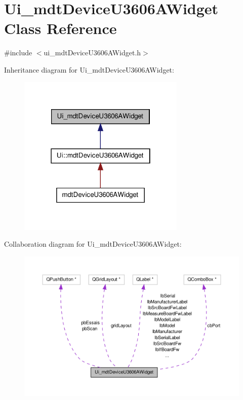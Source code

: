 \hypertarget{class_ui__mdt_device_u3606_a_widget}{\section{Ui\-\_\-mdt\-Device\-U3606\-A\-Widget Class Reference}
\label{class_ui__mdt_device_u3606_a_widget}
}


{\ttfamily \#include $<$ui\-\_\-mdt\-Device\-U3606\-A\-Widget.\-h$>$}



Inheritance diagram for Ui\-\_\-mdt\-Device\-U3606\-A\-Widget\-:
\nopagebreak
\begin{figure}[H]
\begin{center}
\leavevmode
\includegraphics[width=226pt]{class_ui__mdt_device_u3606_a_widget__inherit__graph}
\end{center}
\end{figure}


Collaboration diagram for Ui\-\_\-mdt\-Device\-U3606\-A\-Widget\-:
\nopagebreak
\begin{figure}[H]
\begin{center}
\leavevmode
\includegraphics[width=350pt]{class_ui__mdt_device_u3606_a_widget__coll__graph}
\end{center}
\end{figure}
